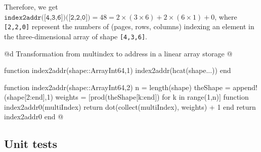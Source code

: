 Therefore, we get $\texttt{index2addr([4,3,6])([2,2,0])}=48= 2\times(3\times 6)+2\times(6\times 1)+0$,
where \texttt{[2,2,0]} represent the numbers of (pages, rows, columns) indexing an element in the three-dimensional array of shape \texttt{[4,3,6]}.

@d Transformation from multindex to address in a linear array storage
@{function index2addr(shape::Array{Int64,1})
	index2addr(hcat(shape...))
end

function index2addr(shape::Array{Int64,2})
    n = length(shape)
    theShape = append!(shape[2:end],1)
    weights = [prod(theShape[k:end]) for k in range(1,n)]
    function index2addr0(multiIndex)
        return dot(collect(multiIndex), weights) + 1
    end
    return index2addr0
end
@}

\subsection{Unit tests}

